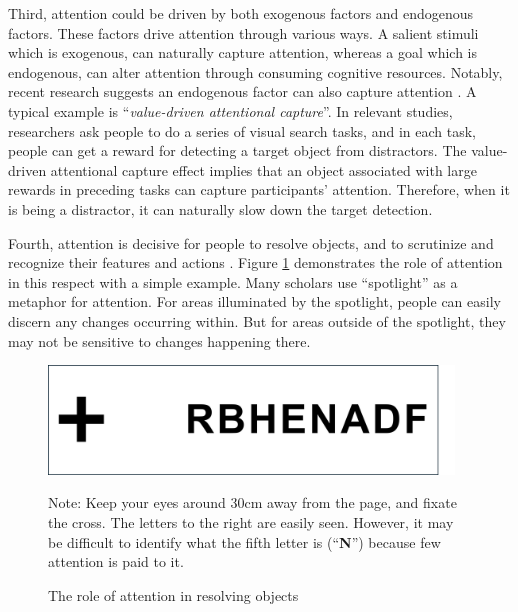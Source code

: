 \documentclass[
  12pt,
]{article}
\begin{document}
Third, attention could be driven by both exogenous factors and
endogenous factors. These factors drive attention through various ways.
A salient stimuli which is exogenous, can naturally capture attention,
whereas a goal which is endogenous, can alter attention through
consuming cognitive resources. Notably, recent research suggests an
endogenous factor can also capture attention
\citep{awh2012top, failing2018selection}. A typical example is
``\emph{value-driven attentional
capture}''\citep{hickey2010reward, anderson2011value, chelazzi2013rewards}.
In relevant studies, researchers ask people to do a series of visual
search tasks, and in each task, people can get a reward for detecting a
target object from distractors. The value-driven attentional capture
effect implies that an object associated with large rewards in preceding
tasks can capture participants' attention. Therefore, when it is being a
distractor, it can naturally slow down the target detection.

Fourth, attention is decisive for people to resolve objects, and to
scrutinize and recognize their features and actions
\citep{he1996attentional, intriligator2001spatial}. Figure
\ref{fig:attention_example} demonstrates the role of attention in this
respect with a simple example. Many scholars use ``spotlight'' as a
metaphor for attention. For areas illuminated by the spotlight, people
can easily discern any changes occurring within. But for areas outside
of the spotlight, they may not be sensitive to changes happening there.

\begin{figure}   
  \vspace{16pt}   
  \centering   
  \includegraphics[width=0.96\textwidth]{figures/attention_example.png}    
  \caption{The role of attention in resolving objects}   
  \label{fig:attention_example}

\vspace*{4pt}  
\begin{minipage}{1.0\textwidth}
{\par\footnotesize Note: Keep your eyes around 30cm away from the page, and fixate the cross. The letters to the right are easily seen. However, it may be difficult to identify what the fifth letter is (``\textbf{N}'') because few attention is paid to it.}
\end{minipage}  
\end{figure}
\end{document}
